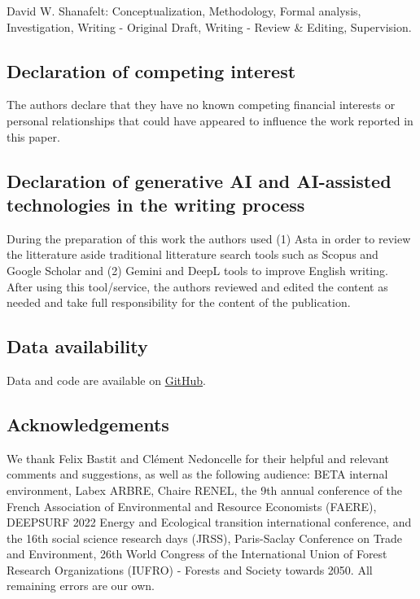 \documentclass[
  authoryear,
  review,
  3p]{elsarticle}
\begin{document}
David W. Shanafelt: Conceptualization, Methodology, Formal analysis,
Investigation, Writing - Original Draft, Writing - Review \& Editing,
Supervision.

\subsection{Declaration of competing
interest}\label{declaration-of-competing-interest}

The authors declare that they have no known competing financial
interests or personal relationships that could have appeared to
influence the work reported in this paper.

\subsection{Declaration of generative AI and AI-assisted technologies in
the writing
process}\label{declaration-of-generative-ai-and-ai-assisted-technologies-in-the-writing-process}

During the preparation of this work the authors used (1) Asta in order
to review the litterature aside traditional litterature search tools
such as Scopus and Google Scholar and (2) Gemini and DeepL tools to
improve English writing. After using this tool/service, the authors
reviewed and edited the content as needed and take full responsibility
for the content of the publication.

\subsection{Data availability}\label{data-availability}

Data and code are available on
\href{https://github.com/vlmathieu/trade_network_analysis}{GitHub}.

\subsection{Acknowledgements}\label{acknowledgements}

We thank Felix Bastit and Clément Nedoncelle for their helpful and
relevant comments and suggestions, as well as the following audience:
BETA internal environment, Labex ARBRE, Chaire RENEL, the 9th annual
conference of the French Association of Environmental and Resource
Economists (FAERE), DEEPSURF 2022 Energy and Ecological transition
international conference, and the 16th social science research days
(JRSS), Paris-Saclay Conference on Trade and Environment, 26th World
Congress of the International Union of Forest Research Organizations
(IUFRO) - Forests and Society towards 2050. All remaining errors are our
own.
\end{document}
